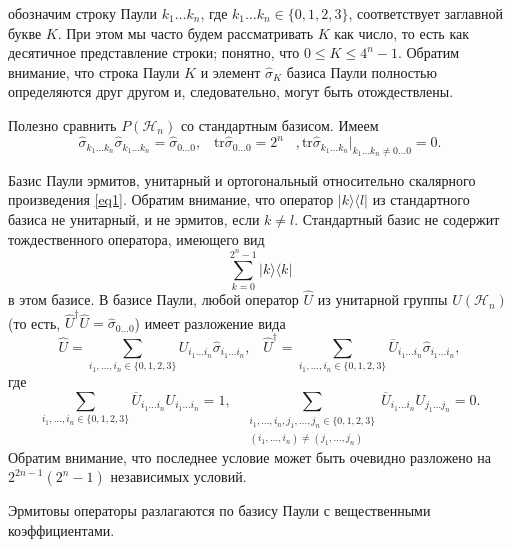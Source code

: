 \documentclass[a4paper]{report}
\begin{document}
\noindent обозначим строку Паули ${{k_1}\ldots k_n}$, где ${{k_1}\ldots k_n \in \{0,1,2,3\}}$, соответствует заглавной букве ${K}$. При этом мы часто будем рассматривать ${K}$ как число, то есть как десятичное представление строки; понятно, что ${0 \leq K \leq 4^n - 1}$. Обратим внимание, что строка Паули ${K}$ и элемент ${\hat{\sigma}_K}$ базиса Паули полностью определяются друг другом и, следовательно, могут быть отождествлены.

Полезно сравнить ${P(\mathcal{H}_n)}$ со стандартным базисом. Имеем
\begin{equation}\tag{4}\label{eq4}
    \hat{\sigma}_{k_1\ldots k_n} \hat{\sigma}_{k_1\ldots k_n} = \hat{\sigma}_{0\ldots 0}, \;\;\;
    \mathrm{tr} \hat{\sigma}_{0\ldots 0} = 2^n\;\;\;,
    \mathrm{tr}\hat{\sigma}_{k_1\ldots k_n}\Big|_{k_1\ldots k_n \neq 0\ldots0} = 0.
\end{equation}

Базис Паули эрмитов, унитарный и ортогональный относительно скалярного произведения \eqref{eq1}. Обратим внимание, что оператор ${|k\rangle\langle l|}$ из стандартного базиса не унитарный, и не эрмитов, если ${k\neq l}$. Стандартный базис не содержит тождественного оператора, имеющего вид
$${
            \sum_{k=0}^{2^n-1} |k\rangle \langle k|
        }$$
\noindent в этом базисе. В базисе Паули, любой оператор ${\hat{U}}$ из унитарной группы ${U(\mathcal{H}_n)}$ (то есть, ${\hat{U}^\dagger\hat{U}=\hat{\sigma}_{0\ldots0}}$) имеет разложение вида
$${
    \hat{U} = \sum_{i_1,\ldots,i_n\in\{0,1,2,3\}}U_{i_1\ldots i_n}\hat{\sigma}_{i_1\ldots i_n},\;\;\;\hat{U}^\dagger = \sum_{i_1,\ldots,i_n\in\{0,1,2,3\}}\overline{U}_{i_1\ldots i_n}\hat{\sigma}_{i_1\ldots i_n},
    }$$
\noindent где
$${
    \sum_{i_1,\ldots,i_n\in\{0,1,2,3\}}\overline{U}_{i_1\ldots i_n}U_{i_1\ldots i_n} = 1,\;\;\;
    \sum_{
        \begin{smallmatrix}
            i_1,\ldots,i_n,j_1,\ldots,j_n\in\{0,1,2,3\}\\
            (i_1,\ldots,i_n)\neq(j_1,\ldots,j_n)
        \end{smallmatrix}} \overline{U}_{i_1\ldots i_n}U_{j_1\ldots j_n} = 0.
    }$$
\noindent Обратим внимание, что последнее условие может быть очевидно разложено на ${2^{2n-1}(2^n-1)}$ независимых условий.

Эрмитовы операторы разлагаются по базису Паули с вещественными коэффициентами.
\newpage

\end{document}
